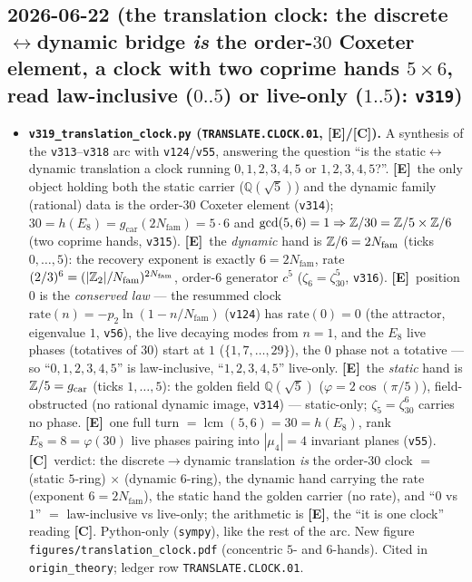 \documentclass[11pt]{article}
\providecommand{\mE}{\textbf{[E]}}\providecommand{\mC}{\textbf{[C]}}
\providecommand{\gcar}{g_{\mathrm{car}}}\providecommand{\Nfam}{N_{\mathrm{fam}}}
\begin{document}
\subsection*{2026-06-22 (the translation clock: the discrete$\leftrightarrow$dynamic bridge \emph{is} the order-$30$ Coxeter element, a clock with two coprime hands $5\times6$, read law-inclusive ($0..5$) or live-only ($1..5$): \texttt{v319})}
\begin{itemize}
\item \textbf{\texttt{v319\_translation\_clock.py} (\texttt{TRANSLATE.CLOCK.01}, \mE/\mC).} A synthesis of the
  \texttt{v313}--\texttt{v318} arc with \texttt{v124}/\texttt{v55}, answering the question ``is the
  static$\leftrightarrow$dynamic translation a clock running $0,1,2,3,4,5$ or $1,2,3,4,5$?''. \mE\ the only object
  holding both the static carrier ($\mathbb Q(\sqrt5)$) and the dynamic family (rational) data is the order-$30$
  Coxeter element (\texttt{v314}); $30=h(E_8)=\gcar(2\Nfam)=5\cdot6$ and $\gcd(5,6)=1\Rightarrow\mathbb{Z}/30=\mathbb{Z}/5\times\mathbb{Z}/6$
  (two coprime hands, \texttt{v315}). \mE\ the \emph{dynamic} hand is $\Z/6=2\Nfam$ (ticks $0,\dots,5$): the recovery
  exponent is exactly $6=2\Nfam$, rate $(2/3)^6=(|\Z_2|/\Nfam)^{2\Nfam}$, order-$6$ generator $c^5$
  ($\zeta_6=\zeta_{30}^5$, \texttt{v316}). \mE\ position $0$ is the \emph{conserved law} --- the resummed clock
  $\mathrm{rate}(n)=-p_2\ln(1-n/\Nfam)$ (\texttt{v124}) has $\mathrm{rate}(0)=0$ (the attractor, eigenvalue $1$,
  \texttt{v56}), the live decaying modes from $n{=}1$, and the $E_8$ live phases (totatives of $30$) start at $1$
  ($\{1,7,\dots,29\}$), the $0$ phase not a totative --- so ``$0,1,2,3,4,5$'' is law-inclusive, ``$1,2,3,4,5$''
  live-only. \mE\ the \emph{static} hand is $\Z/5=\gcar$ (ticks $1,\dots,5$): the golden field $\mathbb Q(\sqrt5)$
  ($\varphi=2\cos(\pi/5)$), field-obstructed (no rational dynamic image, \texttt{v314}) --- static-only;
  $\zeta_5=\zeta_{30}^6$ carries no phase. \mE\ one full turn $=\operatorname{lcm}(5,6)=30=h(E_8)$, rank
  $E_8=8=\varphi(30)$ live phases pairing into $|\mu_4|=4$ invariant planes (\texttt{v55}). \mC\ verdict: the
  discrete$\to$dynamic translation \emph{is} the order-$30$ clock $=$ (static $5$-ring) $\times$ (dynamic $6$-ring),
  the dynamic hand carrying the rate (exponent $6=2\Nfam$), the static hand the golden carrier (no rate), and
  ``$0$ vs $1$'' $=$ law-inclusive vs live-only; the arithmetic is \mE, the ``it is one clock'' reading \mC.
  Python-only (\texttt{sympy}), like the rest of the arc. New figure \texttt{figures/translation\_clock.pdf}
  (concentric $5$- and $6$-hands). Cited in \texttt{origin\_theory}; ledger row \texttt{TRANSLATE.CLOCK.01}.
\end{itemize}
\end{document}

